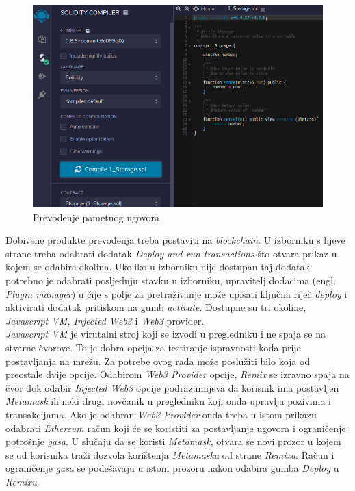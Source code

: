 \documentclass[times, utf8, zavrsni, numeric]{fer}
\begin{document}
\begin{figure}[ht]
  \includegraphics[width=\textwidth]{remixcompiled.png}
  \caption{Prevođenje pametnog ugovora}
  \centering
  \vfill
\end{figure}

\pagebreak

Dobivene produkte prevođenja treba postaviti na \emph{blockchain}. U izborniku s lijeve strane treba odabrati dodatak \emph{Deploy and run transactions} što otvara
prikaz u kojem se odabire okolina. Ukoliko u izborniku nije dostupan taj dodatak potrebno je odabrati posljednju stavku u izborniku, upravitelj dodacima (engl. \emph{Plugin manager})
u čije s polje za pretraživanje može upisati ključna riječ \emph{deploy} i aktivirati dodatak pritiskom na gumb \emph{activate}.
Dostupne su tri okoline, \emph{Javascript VM, Injected Web3} i \emph{Web3} provider. \\
\emph{Javascript VM} je virutalni stroj koji se izvodi u pregledniku i ne spaja se na stvarne čvorove. To je dobra opcija za testiranje ispravnosti koda prije postavljanja
na mrežu. Za potrebe ovog rada može poslužiti bilo koja od preostale dvije opcije. Odabirom \emph{Web3 Provider} opcije, \emph{Remix} se izravno spaja na čvor dok odabir
\emph{Injected Web3} opcije podrazumijeva da korisnik ima postavljen \emph{Metamask} ili neki drugi novčanik u pregledniku koji onda upravlja pozivima i transakcijama.
Ako je odabran \emph{Web3 Provider} onda treba u istom prikazu odabrati \emph{Ethereum} račun koji će se koristiti za postavljanje ugovora i ograničenje potrošnje
\emph{gasa}. U slučaju da se koristi \emph{Metamask}, otvara se novi prozor u kojem se od korisnika traži dozvola korištenja \emph{Metamaska} od strane \emph{Remixa}.
Račun i ograničenje \emph{gasa} se podešavaju u istom prozoru nakon odabira gumba \emph{Deploy} u \emph{Remixu}. 
\end{document}
